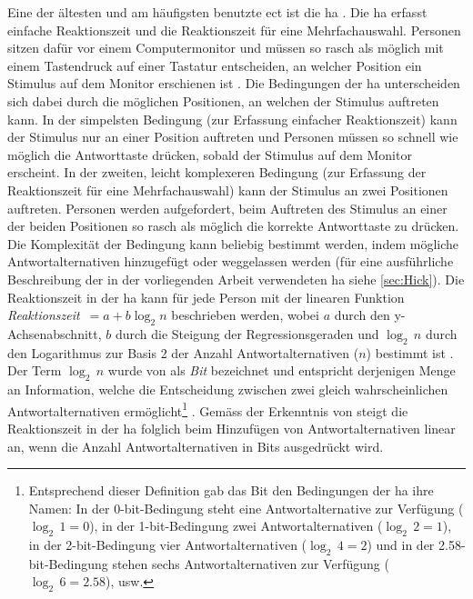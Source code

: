 \documentclass[11pt, twoside, a4paper]{book}		%
\begin{document}
Eine der ältesten und am häufigsten benutzte \gls{ect} ist die \gls{ha} \citep{Hick1952}. Die \gls{ha} erfasst einfache Reaktionszeit und die Reaktionszeit für eine Mehrfachauswahl. Personen sitzen dafür vor einem Computermonitor und müssen so rasch als möglich mit einem Tastendruck auf einer Tastatur entscheiden, an welcher Position ein Stimulus auf dem Monitor erschienen ist \citep[z.~B.][]{Rammsayer2007}. Die Bedingungen der \gls{ha} unterscheiden sich dabei durch die möglichen Positionen, an welchen der Stimulus auftreten kann. In der simpelsten Bedingung (zur Erfassung einfacher Reaktionszeit) kann der Stimulus nur an einer Position auftreten und Personen müssen so schnell wie möglich die Antworttaste drücken, sobald der Stimulus auf dem Monitor erscheint. In der zweiten, leicht komplexeren Bedingung (zur Erfassung der Reaktionszeit für eine Mehrfachauswahl) kann der Stimulus an zwei Positionen auftreten. Personen werden aufgefordert, beim Auftreten des Stimulus an einer der beiden Positionen so rasch als möglich die korrekte Antworttaste zu drücken. Die Komplexität der Bedingung kann beliebig bestimmt werden, indem mögliche Antwortalternativen hinzugefügt oder weggelassen werden (für eine ausführliche Beschreibung der in der vorliegenden Arbeit verwendeten \gls{ha} siehe \autoref{sec:Hick}). 
Die Reaktionszeit in der \gls{ha} kann für jede Person mit der linearen Funktion \textit{Reaktionszeit}~$=a+b\log_{2}n$ beschrieben werden, wobei $a$ durch den y-Achsen\-ab\-schnitt, $b$ durch die Steigung der Regres\-sions\-geraden und $\log_{2}\,n$ durch den Logarithmus zur Basis 2 der Anzahl Antwortalternativen ($n$) bestimmt ist \citep[S. 105]{Jensen1987a}. Der Term $\log_{2}\,n$ wurde von \citet{Hick1952} als \textit{Bit} bezeichnet und entspricht derjenigen Menge an Information, welche die Entscheidung zwischen zwei gleich wahrscheinlichen Antwortalternativen ermöglicht\footnote{Entsprechend dieser Definition gab das Bit den Bedingungen der \gls{ha} ihre Namen: In der 0-bit-Bedingung steht eine Antwortalternative zur Verfügung ($\log_{2}\,1=0$), in der 1-bit-Bedingung zwei Antwortalternativen ($\log_{2}\,2=1$), in der 2-bit-Bedingung vier Antwortalternativen ($\log_{2}\,4=2$) und in der 2.58-bit-Bedingung stehen sechs Antwortalternativen zur Verfügung ($\log_{2}\,6=2.58$), usw.} \citep[siehe auch][S. 27]{Jensen2006}. Gemäss der Erkenntnis von \citet{Hick1952} steigt die Reaktionszeit in der \gls{ha} folglich beim Hinzufügen von Antwortalternativen linear an, wenn die Anzahl Antwortalternativen in Bits ausgedrückt wird.
\end{document}
